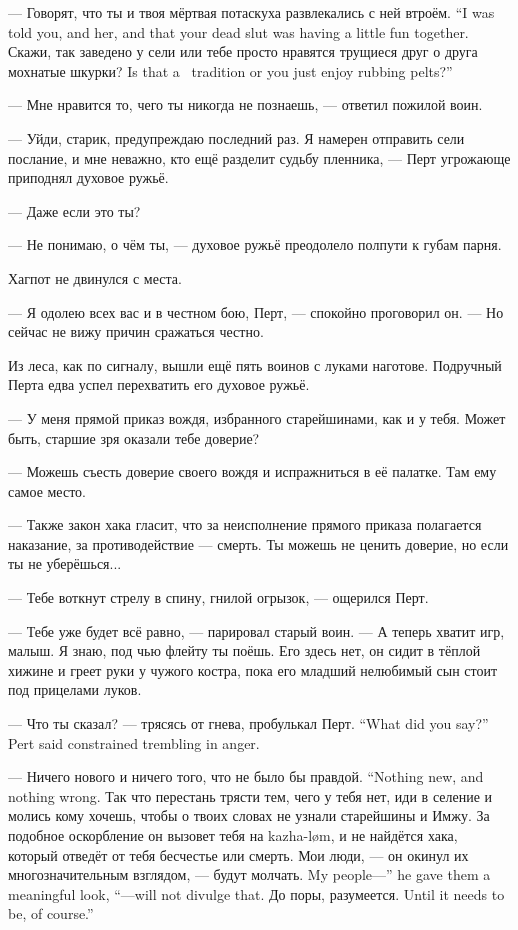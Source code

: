 {--- Говорят, что ты и твоя мёртвая потаскуха развлекались с ней втроём.}
{``I was told you, and her, and that your dead slut was having a little fun together.}
{Скажи, так заведено у сели или тебе просто нравятся трущиеся друг о друга мохнатые шкурки?}
{Is that a \Seli\ tradition or you just enjoy rubbing pelts?''}

--- Мне нравится то, чего ты никогда не познаешь, --- ответил пожилой воин.

--- Уйди, старик, предупреждаю последний раз.
Я намерен отправить сели послание, и мне неважно, кто ещё разделит судьбу пленника, --- Перт угрожающе приподнял духовое ружьё.

--- Даже если это ты?

--- Не понимаю, о чём ты, --- духовое ружьё преодолело полпути к губам парня.

Хагпот не двинулся с места.

--- Я одолею всех вас и в честном бою, Перт, --- спокойно проговорил он.
--- Но сейчас не вижу причин сражаться честно.

Из леса, как по сигналу, вышли ещё пять воинов с луками наготове.
Подручный Перта едва успел перехватить его духовое ружьё.

--- У меня прямой приказ вождя, избранного старейшинами, как и у тебя.
Может быть, старшие зря оказали тебе доверие?

--- Можешь съесть доверие своего вождя и испражниться в её палатке.
Там ему самое место.

--- Также закон хака гласит, что за неисполнение прямого приказа полагается наказание, за противодействие --- смерть.
Ты можешь не ценить доверие, но если ты не уберёшься...

--- Тебе воткнут стрелу в спину, гнилой огрызок, --- ощерился Перт.

--- Тебе уже будет всё равно, --- парировал старый воин.
--- А теперь хватит игр, малыш.
Я знаю, под чью флейту ты поёшь.
Его здесь нет, он сидит в тёплой хижине и греет руки у чужого костра, пока его младший нелюбимый сын стоит под прицелами луков.

{--- Что ты сказал? --- трясясь от гнева, пробулькал Перт.}
{``What did you say?'' Pert said constrained trembling in anger.}

{--- Ничего нового и ничего того, что не было бы правдой.}
{``Nothing new, and nothing wrong.}
Так что перестань трясти тем, чего у тебя нет, иди в селение и молись кому хочешь, чтобы о твоих словах не узнали старейшины и Имжу.
За подобное оскорбление он вызовет тебя на kazha-l\o m, и не найдётся хака, который отведёт от тебя бесчестье или смерть.
{Мои люди, --- он окинул их многозначительным взглядом, --- будут молчать.}
{My people---'' he gave them a meaningful look, ``---will not divulge that.}
{До поры, разумеется.}
{Until it needs to be, of course.''}


